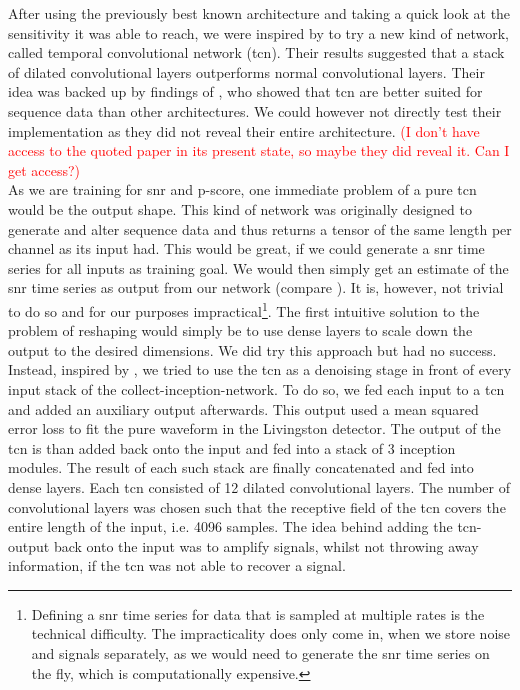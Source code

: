 After using the previously best known architecture and taking a quick look at the sensitivity it was able to reach, we were inspired by \cite{tcn_idea} to try a new kind of network, called temporal convolutional network (\gls{tcn}). Their results suggested that a stack of dilated convolutional layers outperforms normal convolutional layers. Their idea was backed up by findings of \cite{tcn_paper}, who showed that \gls{tcn} are better suited for sequence data than other architectures. We could however not directly test their implementation as they did not reveal their entire architecture. \textcolor{red}{(I don't have access to the quoted paper in its present state, so maybe they did reveal it. Can I get access?)}\\
As we are training for \gls{snr} and p-score, one immediate problem of a pure \gls{tcn} would be the output shape. This kind of network was originally designed to generate and alter sequence data and thus returns a tensor of the same length per channel as its input had. This would be great, if we could generate a \gls{snr} time series for all inputs as training goal. We would then simply get an estimate of the \gls{snr} time series as output from our network (compare \cite{cnn_magiacal_bullet}). It is, however, not trivial to do so and for our purposes impractical\footnote{Defining a \gls{snr} time series for data that is sampled at multiple rates is the technical difficulty. The impracticality does only come in, when we store noise and signals separately, as we would need to generate the \gls{snr} time series on the fly, which is computationally expensive.}. The first intuitive solution to the problem of reshaping would simply be to use dense layers to scale down the output to the desired dimensions. We did try this approach
 but had no success. Instead, inspired by \cite{dnn_denoising}, we tried to use the \gls{tcn} as a denoising stage in front of every input stack of the collect-inception-network. To do so, we fed each input to a \gls{tcn} and added an auxiliary output afterwards. This output used a mean squared error loss to fit the pure waveform in the Livingston detector. The output of the \gls{tcn} is than added back onto the input and fed into a stack of 3 inception modules. The result of each such stack are finally concatenated and fed into dense layers. Each \gls{tcn} consisted of 12 dilated convolutional layers. The number of convolutional layers was chosen such that the receptive field of the \gls{tcn} covers the entire length of the input, i.e. 4096 samples. The idea behind adding the \gls{tcn}-output back onto the input was to amplify signals, whilst not throwing away information, if the \gls{tcn} was not able to recover a signal.\\
